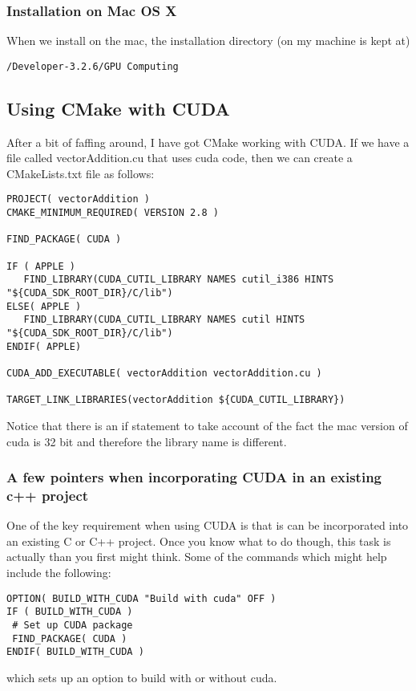 \documentclass[a4paper, 10pt]{article}
\begin{document}
\subsubsection*{Installation on Mac OS X}
\label{sec:installation-mac-os}

When we install on the mac, the installation directory (on my machine
is kept at)
\begin{verbatim}
/Developer-3.2.6/GPU Computing
\end{verbatim}

\subsection*{Using CMake with CUDA}
\label{sec:using-cmake-with}

After a bit of faffing around, I have got CMake working with CUDA. If
we have a file called vectorAddition.cu that uses cuda code, then we
can create a CMakeLists.txt file as follows:

\begin{verbatim}
PROJECT( vectorAddition )
CMAKE_MINIMUM_REQUIRED( VERSION 2.8 )

FIND_PACKAGE( CUDA )

IF ( APPLE )
   FIND_LIBRARY(CUDA_CUTIL_LIBRARY NAMES cutil_i386 HINTS "${CUDA_SDK_ROOT_DIR}/C/lib")
ELSE( APPLE )
   FIND_LIBRARY(CUDA_CUTIL_LIBRARY NAMES cutil HINTS "${CUDA_SDK_ROOT_DIR}/C/lib")
ENDIF( APPLE) 

CUDA_ADD_EXECUTABLE( vectorAddition vectorAddition.cu )

TARGET_LINK_LIBRARIES(vectorAddition ${CUDA_CUTIL_LIBRARY})
\end{verbatim}

Notice that there is an if statement to take account of the fact the
mac version of cuda is 32 bit and therefore the library name is
different. 

\subsubsection*{A few pointers when incorporating CUDA in an existing c++ project}
\label{sec:few-pointers-when}

One of the key requirement when using CUDA is that is can be
incorporated into an existing C or C++ project. Once you know what to
do though, this task is actually than you first might think. Some of
the commands which might help include the following:
\begin{verbatim}
OPTION( BUILD_WITH_CUDA "Build with cuda" OFF )
IF ( BUILD_WITH_CUDA )
 # Set up CUDA package
 FIND_PACKAGE( CUDA )
ENDIF( BUILD_WITH_CUDA )
\end{verbatim}
which sets up an option to build with or without cuda.
\end{document}
